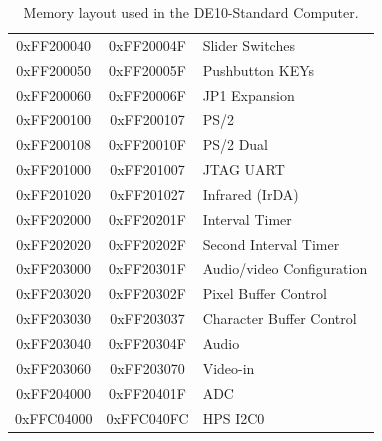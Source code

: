 \documentclass[11pt, twoside, pdftex]{article}
\newcommand{\commonFiles}{../../../common/doc}
\newcommand{\templatePath}{../../../common/templates}
\newcommand{\systemName}{DE10-Standard Computer}
\begin{document}
\begin{table}[h]
\begin{center}
\begin{tabular}{c|c|l}
        \\
            0xFF200040
            & 0xFF20004F
            & Slider Switches
        \\
            0xFF200050
            & 0xFF20005F
            & Pushbutton KEYs
        \\
            0xFF200060
            & 0xFF20006F
            & JP1 Expansion
        \\
            0xFF200100
            & 0xFF200107
            & PS/2
        \\
            0xFF200108
            & 0xFF20010F
            & PS/2 Dual
        \\
            0xFF201000
            & 0xFF201007
            & JTAG UART
        \\
            0xFF201020
            & 0xFF201027
				& Infrared (IrDA)
        \\
            0xFF202000
            & 0xFF20201F
            & Interval Timer
        \\
            0xFF202020
            & 0xFF20202F
            & Second Interval Timer
        \\
            0xFF203000
            & 0xFF20301F
            & Audio/video Configuration
        \\
            0xFF203020
            & 0xFF20302F
            & Pixel Buffer Control
        \\
            0xFF203030
            & 0xFF203037
            & Character Buffer Control
        \\
            0xFF203040
            & 0xFF20304F
            & Audio
        \\
            0xFF203060
            & 0xFF203070
            & Video-in
        \\
            0xFF204000
            & 0xFF20401F
            & ADC
        \\
            0xFFC04000
            & 0xFFC040FC
            & HPS I2C0
        \\
    \end{tabular}
    \caption{Memory layout used in the \systemName.}
    \label{tab:memorylayout}
    \end{center}
\end{table}


\clearpage












\end{document}
